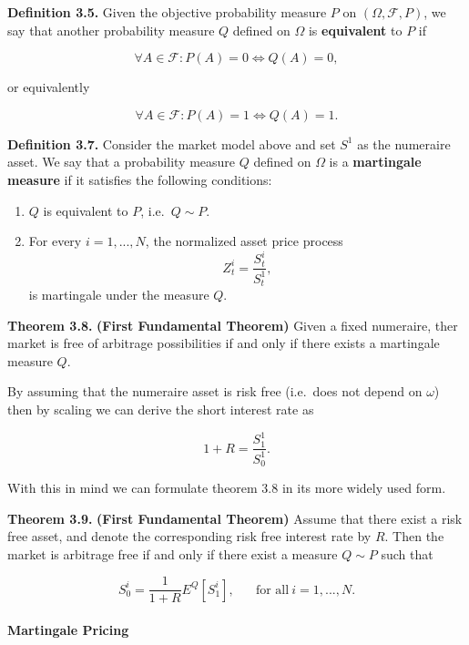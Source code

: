 \documentclass[
]{article}
\providecommand{\tightlist}{%
  \setlength{\itemsep}{0pt}\setlength{\parskip}{0pt}}
\begin{document}
\textbf{Definition 3.5.} Given the objective probability measure \(P\)
on \((\Omega,\mathcal{F},P)\), we say that another probability measure
\(Q\) defined on \(\Omega\) is \textbf{equivalent} to \(P\) if

\[
\forall A\in\mathcal{F}:P(A)=0\iff Q(A)=0,
\]

or equivalently

\[
\forall A\in\mathcal{F}:P(A)=1\iff Q(A)=1.
\]

\textbf{Definition 3.7.} Consider the market model above and set \(S^1\)
as the numeraire asset. We say that a probability measure \(Q\) defined
on \(\Omega\) is a \textbf{martingale measure} if it satisfies the
following conditions:

\begin{enumerate}
\def\labelenumi{\arabic{enumi}.}
\tightlist
\item
  \(Q\) is equivalent to \(P\), i.e.~\(Q\sim P\).
\item
  For every \(i=1,...,N\), the normalized asset price process \[
    Z_t^i=\frac{S_t^i}{S_t^1},
    \] is martingale under the measure \(Q\).
\end{enumerate}

\textbf{Theorem 3.8.} \textbf{(First Fundamental Theorem)} Given a fixed
numeraire, ther market is free of arbitrage possibilities if and only if
there exists a martingale measure \(Q\).

By assuming that the numeraire asset is risk free (i.e.~does not depend
on \(\omega\)) then by scaling we can derive the short interest rate as

\[
1+R=\frac{S_1^1}{S_0^1}.
\]

With this in mind we can formulate theorem 3.8 in its more widely used
form.

\textbf{Theorem 3.9.} \textbf{(First Fundamental Theorem)} Assume that
there exist a risk free asset, and denote the corresponding risk free
interest rate by \(R\). Then the market is arbitrage free if and only if
there exist a measure \(Q\sim P\) such that

\[
S_0^i=\frac{1}{1+R}E^Q[S_1^i],\hspace{20pt}\text{for all}\ i=1,...,N.\tag{3.9}
\]

\hypertarget{martingale-pricing}{%
\paragraph{Martingale Pricing}\label{martingale-pricing}}
\end{document}
